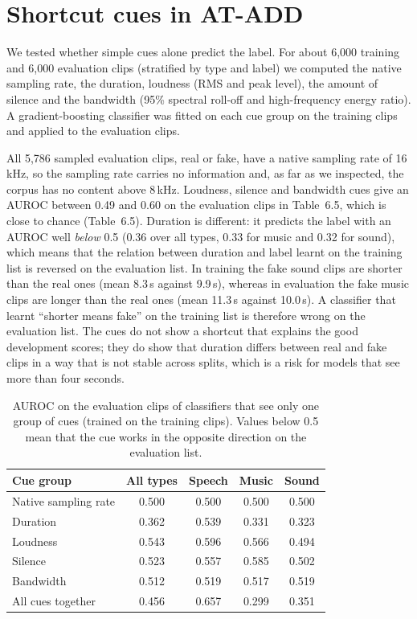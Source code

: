 \documentclass[12pt,a4paper]{report}
\begin{document}
\section{Shortcut cues in AT-ADD}
\label{sec:shortcuts}

We tested whether simple cues alone predict the label. For about 6{,}000 training and 6{,}000 evaluation clips (stratified by type and label) we computed the native sampling rate, the duration, loudness (RMS and peak level), the amount of silence and the bandwidth (95\% spectral roll-off and high-frequency energy ratio). A gradient-boosting classifier was fitted on each cue group on the training clips and applied to the evaluation clips.

All 5{,}786 sampled evaluation clips, real or fake, have a native sampling rate of 16\,kHz, so the sampling rate carries no information and, as far as we inspected, the corpus has no content above 8\,kHz. Loudness, silence and bandwidth cues give an AUROC between 0.49 and 0.60 on the evaluation clips in Table~6.5, which is close to chance (Table~6.5). Duration is different: it predicts the label with an AUROC well \emph{below} 0.5 (0.36 over all types, 0.33 for music and 0.32 for sound), which means that the relation between duration and label learnt on the training list is reversed on the evaluation list. In training the fake sound clips are shorter than the real ones (mean 8.3\,s against 9.9\,s), whereas in evaluation the fake music clips are longer than the real ones (mean 11.3\,s against 10.0\,s). A classifier that learnt ``shorter means fake'' on the training list is therefore wrong on the evaluation list. The cues do not show a shortcut that explains the good development scores; they do show that duration differs between real and fake clips in a way that is not stable across splits, which is a risk for models that see more than four seconds.

\begin{table}[htbp]
\centering
\caption{AUROC on the evaluation clips of classifiers that see only one group of cues (trained on the training clips). Values below 0.5 mean that the cue works in the opposite direction on the evaluation list.}
\label{tab:shortcuts}
\small

\begin{tabular}{@{}lcccc@{}}
\toprule
Cue group & All types & Speech & Music & Sound \\
\midrule
Native sampling rate & 0.500 & 0.500 & 0.500 & 0.500 \\
Duration & 0.362 & 0.539 & 0.331 & 0.323 \\
Loudness & 0.543 & 0.596 & 0.566 & 0.494 \\
Silence & 0.523 & 0.557 & 0.585 & 0.502 \\
Bandwidth & 0.512 & 0.519 & 0.517 & 0.519 \\
All cues together & 0.456 & 0.657 & 0.299 & 0.351 \\
\bottomrule
\end{tabular}

\end{table}
\end{document}
